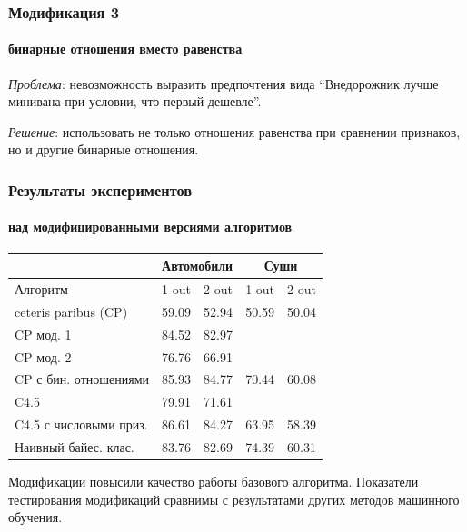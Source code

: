 \documentclass[xcolor=table]{beamer}
\theoremstyle{definition}
\begin{document}
	\begin{frame}
		\frametitle{Модификация 3}
		\framesubtitle{бинарные отношения вместо равенства}
		
		\emph{Проблема}: невозможность выразить предпочтения вида ``Внедорожник лучше минивана при условии, что первый дешевле''.
		
		\pause
		
		\vspace{1em}
		\emph{Решение}: использовать не только отношения равенства при сравнении признаков, но и другие бинарные отношения.
	\end{frame}
	
	\begin{frame}
		\frametitle{Результаты экспериментов}
		\framesubtitle{над модифицированными версиями алгоритмов}
		\begin{center}
		\begin{tabular}{|l|ll|ll|}
			\hline
			& \multicolumn{2}{c|}{Автомобили} & \multicolumn{2}{c|}{Суши} \\ \hline
			Алгоритм               & 1-out          & 2-out          & 1-out       & 2-out       \\ \hline
			ceteris paribus (CP)   & 59.09          & 52.94          & 50.59       & 50.04       \\
			\rowcolor[HTML]{CEFFCE} 
			CP мод. 1              & 84.52          & 82.97          &             &             \\
			\rowcolor[HTML]{CEFFCE} 
			CP мод. 2              & 76.76          & 66.91          &             &             \\
			\rowcolor[HTML]{CEFFCE} 
			CP с бин. отношениями  & 85.93          & 84.77          & 70.44       & 60.08       \\
			C4.5                   & 79.91          & 71.61          &             &             \\
			\rowcolor[HTML]{CEFFCE} 
			C4.5 с числовыми приз. & 86.61          & 84.27          & 63.95       & 58.39       \\
			Наивный байес. клас.   & 83.76          & 82.69          & 74.39       & 60.31       \\ \hline
		\end{tabular}
		\end{center}
		
		Модификации повысили качество работы базового алгоритма. Показатели тестирования модификаций сравнимы с результатами других методов машинного обучения.
	\end{frame}
	
\end{document}
